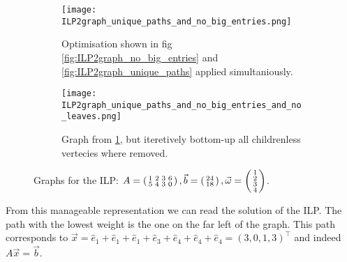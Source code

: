 \begin{figure}
    \centering
    \begin{subfigure}[b]{0.45\textwidth}
        \texttt{[image: ILP2graph\_unique\_paths\_and\_no\_big\_entries.png]}
        \caption{Optimisation shown in fig \ref{fig:ILP2graph_no_big_entries} and \ref{fig:ILP2graph_unique_paths} applied simultaniously.}
        \label{fig:ILP2graph_unique_paths_and_no_big_entries}
    \end{subfigure}
    \hfill
    \begin{subfigure}[b]{0.45\textwidth}
        \centering
        \texttt{[image: ILP2graph\_unique\_paths\_and\_no\_big\_entries\_and\_no\_leaves.png]}
        \caption{Graph from \ref{fig:ILP2graph_unique_paths_and_no_big_entries}, but iteretively bottom-up all childrenless vertecies where removed.}
        \label{fig:ILP2graph_unique_paths_and_no_big_entries_and_no_leaves}
    \end{subfigure}
    \caption{Graphs for the ILP: $A = \left(\begin{smallmatrix}1&2&3&6\\5&4&3&0\end{smallmatrix}\right), \vec b = \left(\begin{smallmatrix}24\\18\end{smallmatrix}\right), \vec \omega = \left(\begin{smallmatrix}1\\2\\3\\4\end{smallmatrix}\right)$.}
\end{figure}


From this manageable representation we can read the solution of the ILP. The path with the lowest weight is the one on the far left of the graph. This path corresponds to $\vec x = \hat e_1 + \hat e_1 + \hat e_1 + \hat e_3 + \hat e_4 + \hat e_4 + \hat e_4 = (3, 0, 1, 3)^\top$ and indeed $A\vec x = \vec b$. 

